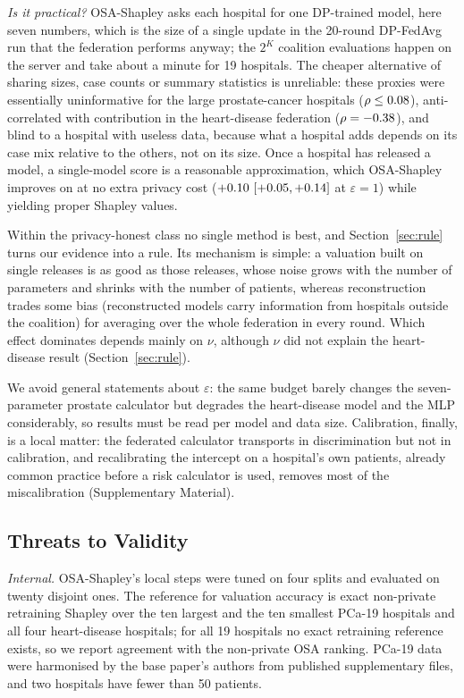 \documentclass[journal]{IEEEtran}
\begin{document}
\emph{Is it practical?} OSA-Shapley asks each hospital for one DP-trained model, here seven numbers, which is the size of a single update in the 20-round DP-FedAvg run that the federation performs anyway; the $2^K$ coalition evaluations happen on the server and take about a minute for 19 hospitals. The cheaper alternative of sharing sizes, case counts or summary statistics is unreliable: these proxies were essentially uninformative for the large prostate-cancer hospitals ($\rho\le0.08$), anti-correlated with contribution in the heart-disease federation ($\rho=-0.38$), and blind to a hospital with useless data, because what a hospital adds depends on its case mix relative to the others, not on its size. Once a hospital has released a model, a single-model score is a reasonable approximation, which OSA-Shapley improves on at no extra privacy cost ($+0.10\ [+0.05, +0.14]$ at $\varepsilon=1$) while yielding proper Shapley values.

Within the privacy-honest class no single method is best, and Section~\ref{sec:rule} turns our evidence into a rule. Its mechanism is simple: a valuation built on single releases is as good as those releases, whose noise grows with the number of parameters and shrinks with the number of patients, whereas reconstruction trades some bias (reconstructed models carry information from hospitals outside the coalition) for averaging over the whole federation in every round. Which effect dominates depends mainly on $\nu$, although $\nu$ did not explain the heart-disease result (Section~\ref{sec:rule}).

We avoid general statements about $\varepsilon$: the same budget barely changes the seven-parameter prostate calculator but degrades the heart-disease model and the MLP considerably, so results must be read per model and data size. Calibration, finally, is a local matter: the federated calculator transports in discrimination but not in calibration, and recalibrating the intercept on a hospital's own patients, already common practice before a risk calculator is used, removes most of the miscalibration (Supplementary Material).

\subsection{Threats to Validity}
\label{sec:threats_validity}
\emph{Internal.} OSA-Shapley's local steps were tuned on four splits and evaluated on twenty disjoint ones. The reference for valuation accuracy is exact non-private retraining Shapley over the ten largest and the ten smallest PCa-19 hospitals and all four heart-disease hospitals; for all 19 hospitals no exact retraining reference exists, so we report agreement with the non-private OSA ranking. PCa-19 data were harmonised by the base paper's authors from published supplementary files, and two hospitals have fewer than 50 patients.
\end{document}
